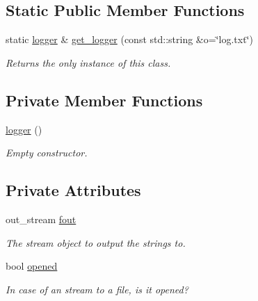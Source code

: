 \subsection*{Static Public Member Functions}
\begin{DoxyCompactItemize}
\item 
static \hyperlink{classlgraph_1_1utils_1_1logger}{logger} \& \hyperlink{classlgraph_1_1utils_1_1logger_af9d53836a2c37c72a08cf14f7e071abb}{get\+\_\+logger} (const std\+::string \&o=\char`\"{}log.\+txt\char`\"{})
\begin{DoxyCompactList}\small\item\em Returns the only instance of this class. \end{DoxyCompactList}\end{DoxyCompactItemize}
\subsection*{Private Member Functions}
\begin{DoxyCompactItemize}
\item 
\hyperlink{classlgraph_1_1utils_1_1logger_ace2028a4b282e3cb6593f6f62fee2f2b}{logger} ()
\begin{DoxyCompactList}\small\item\em Empty constructor. \end{DoxyCompactList}\end{DoxyCompactItemize}
\subsection*{Private Attributes}
\begin{DoxyCompactItemize}
\item 
out\+\_\+stream \hyperlink{classlgraph_1_1utils_1_1logger_aafc1693e642fc967fed16b78d5cd8a5f}{fout}\hypertarget{classlgraph_1_1utils_1_1logger_aafc1693e642fc967fed16b78d5cd8a5f}{}\label{classlgraph_1_1utils_1_1logger_aafc1693e642fc967fed16b78d5cd8a5f}

\begin{DoxyCompactList}\small\item\em The stream object to output the strings to. \end{DoxyCompactList}\item 
bool \hyperlink{classlgraph_1_1utils_1_1logger_a2e159433db285ccfc8120a4aa4ea7481}{opened}\hypertarget{classlgraph_1_1utils_1_1logger_a2e159433db285ccfc8120a4aa4ea7481}{}\label{classlgraph_1_1utils_1_1logger_a2e159433db285ccfc8120a4aa4ea7481}

\begin{DoxyCompactList}\small\item\em In case of an stream to a file, is it opened? \end{DoxyCompactList}\end{DoxyCompactItemize}


